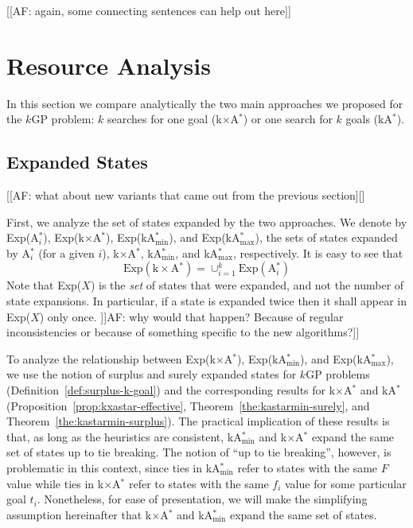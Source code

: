 \documentclass[twoside,11pt]{article}
\newcommand{\kgs}{$k$GP\xspace}
\newcommand{\kastar}{kA$^*$\xspace}
\newcommand{\kastarvar}[1]{\textup{kA}$^*_{#1}$\xspace}
\newcommand{\kastarmin}{\kastarvar{\min}}
\newcommand{\kastarmax}{\kastarvar{\max}}
\newcommand{\kxastar}{k$\times$A$^*$\xspace}
\newcommand{\astari}[1]{A$^*_#1$\xspace}
\begin{document}


[[AF: again, some connecting sentences can help out here]]


\section{Resource Analysis}
\label{sec:resource-analysis}

In this section we compare analytically the two main approaches we proposed for the \kgs problem: $k$ searches for one goal (\kxastar) or one search for $k$ goals (\kastar).

\subsection{Expanded States}
\label{sec:expandedStates}

[[AF: what about new variants that came out from the previous section][]

First, we analyze the set of states expanded by the two approaches.
We denote by Exp(\astari{i}), Exp(\kxastar), Exp(\kastarmin), and Exp(\kastarmax), the sets of states expanded by \astari{i} (for a given $i$), \kxastar, \kastarmin, and \kastarmax, respectively.
It is easy to see that
\begin{equation}
  \text{Exp}(\text{\kxastar})=\cup_{i=1}^k \text{Exp}(\text{\astari{i}})
\end{equation}
Note that Exp($X$) is the \emph{set} of states that were expanded, and not the number of state expansions.
In particular, if a state is expanded twice then it shall appear in Exp($X$) only once. ]]AF: why would that happen? Because of regular inconsistencies or because of something specific to the new algorithms?]]

To analyze the relationship between Exp(\kxastar), Exp(\kastarmin), and Exp(\kastarmax), we use the notion of surplus and surely expanded states for \kgs problems (Definition~\ref{def:surplus-k-goal}) and the corresponding results for \kxastar and \kastar (Proposition~\ref{prop:kxastar-effective}, Theorem~\ref{the:kastarmin-surely}, and Theorem~\ref{the:kastarmin-surplus}).
The practical implication of these results is that, as long as the heuristics are consistent, \kastarmin and \kxastar expand the same set of states up to tie breaking.
The notion of ``up to tie breaking'', however, is problematic in this context, since ties in \kastarmin refer to states with the same $F$ value while ties in \kxastar refer to states with the same $f_i$ value for some particular goal $t_i$.
Nonetheless, for ease of presentation, we will make the simplifying assumption hereinafter that \kxastar and \kastarmin expand the same set of states.
\end{document}
